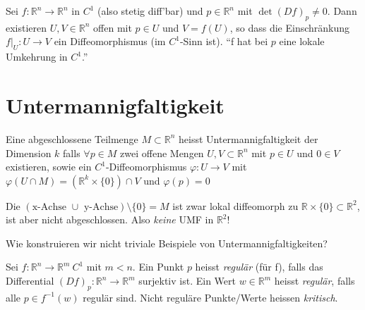 \documentclass[../main.tex]{subfiles}
\begin{document}
\begin{recall}[Umkehrsatz]
Sei $f \colon \mathbb{R}^n \to \mathbb{R}^n$ in $C^1$ (also stetig diff'bar) und $p \in \mathbb{R}^n$ mit $\det(Df)_p \not = 0$. Dann existieren $U,V \in \mathbb{R}^n$ offen mit $p \in U$ und $V=f(U)$, so dass die Einschränkung $f\vert_U \colon U \to V$ ein Diffeomorphismus (im $C^1$-Sinn ist). ``f hat bei $p$ eine lokale Umkehrung in $C^1$.''
\end{recall}

\section{Untermannigfaltigkeit}

\begin{definition}
Eine abgeschlossene Teilmenge $M \subset \mathbb{R}^n$ heisst Untermannigfaltigkeit der Dimension $k$ falls
$\forall p \in M$ zwei offene Mengen $U,V \subset \mathbb{R}^n$ mit $p \in U$ und $0 \in V$ existieren, sowie ein $C^1$-Diffeomorphismus $\varphi \colon U \to V$ mit $\varphi \left(U \cap M\right) = \left(\mathbb{R}^k \times \{0\}\right) \cap V$ und $\varphi(p)=0$
\end{definition}


\begin{example}
\begin{minipage}[t]{30em}
Die $ \left( \text{x-Achse } \cup \text{ y-Achse}\right) \setminus \{0\} = M$ ist zwar lokal diffeomorph zu $\mathbb{R} \times \{0\} \subset \mathbb{R}^2$, ist aber nicht abgeschlossen. Also \emph{keine} UMF in $\mathbb{R}^2$! 
\end{minipage}
\begin{minipage}{1em}
\end{minipage}

\end{example}

\begin{question}
Wie konstruieren wir nicht triviale Beispiele von Untermannigfaltigkeiten?
\end{question}

\begin{definition}
Sei $f \colon \mathbb{R}^n \to \mathbb{R}^m \ C^1$ mit $m<n$.
Ein Punkt $p$ heisst \emph{regulär} (für f), falls das Differential $\left(Df\right)_p \colon \mathbb{R}^n
\to \mathbb{R}^m$ surjektiv ist. Ein Wert $w \in \mathbb{R}^m$ heisst \emph{regulär}, falls alle $p \in f^{-1}(w)$ regulär sind. Nicht reguläre Punkte/Werte heissen \emph{kritisch}.
\end{definition}
\end{document}
